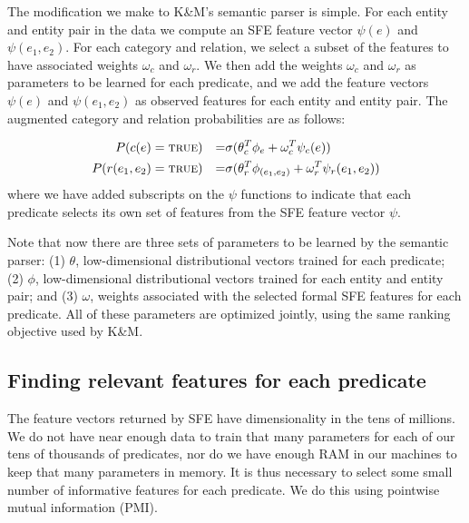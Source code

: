 \documentclass[11pt]{article}
\newcommand{\predicate}[1]{\ensuremath{\textsc{#1}}}
\newcommand{\true}[0]{\predicate{true}}
\begin{document}
The modification we make to K\&M's semantic parser is simple.  For each entity
and entity pair in the data we compute an SFE feature vector $\psi(e)$ and
$\psi(e_1, e_2)$.  For each category and relation, we select a subset of the
features to have associated weights $\omega_c$ and $\omega_r$.  We then add the
weights $\omega_c$ and $\omega_r$ as parameters to be learned for each
predicate, and we add the feature vectors $\psi(e)$ and $\psi(e_1, e_2)$ as
observed features for each entity and entity pair.  The augmented category and
relation probabilities are as follows:

\begin{align*}
  P(c(e) & = \true{}) & = & \sigma ( \theta_c^T \phi_e + \omega_c^T \psi_c(e)) \\
  P(r(e_1, e_2) & = \true{}) & = & \sigma ( \theta_r^T \phi_{(e_1, e_2)} + \omega_r^T \psi_r(e_1, e_2) )
\end{align*}
where we have added subscripts on the $\psi$ functions to indicate that each
predicate selects its own set of features from the SFE feature vector $\psi$.

Note that now there are three sets of parameters to be learned by the semantic
parser: (1) $\theta$, low-dimensional distributional vectors trained for each
predicate; (2) $\phi$, low-dimensional distributional vectors trained for each
entity and entity pair; and (3) $\omega$, weights associated with the selected
formal SFE features for each predicate.  All of these parameters are optimized
jointly, using the same ranking objective used by K\&M.

\subsection{Finding relevant features for each predicate}
\label{sec:computing-pmi}

The feature vectors returned by SFE have dimensionality in the tens of
millions.  We do not have near enough data to train that many parameters for
each of our tens of thousands of predicates, nor do we have enough RAM in our
machines to keep that many parameters in memory.  It is thus necessary to
select some small number of informative features for each predicate.  We do
this using pointwise mutual information (PMI).
\end{document}

